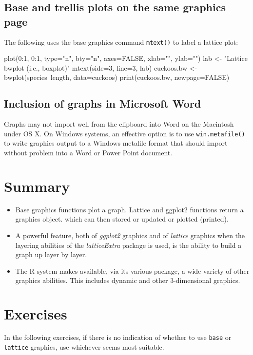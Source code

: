 \documentclass{tufte-book}\usepackage[]{graphicx}\usepackage[]{color}
\newcommand{\txtt}[1]{\texttt{#1}}
\begin{document}
\subsection*{Base and trellis plots on the same graphics page}

The following uses the base graphics command \txtt{mtext()}
to label a lattice plot:
\begin{Schunk}
\begin{Sinput}
plot(0:1, 0:1, type="n", bty="n", axes=FALSE,
     xlab="", ylab="")
lab <- "Lattice bwplot (i.e., boxplot)"
mtext(side=3, line=3, lab)
cuckoos.bw <- bwplot(species~length, data=cuckoos)
print(cuckoos.bw, newpage=FALSE)
\end{Sinput}
\end{Schunk}

\subsection*{Inclusion of graphs in Microsoft Word}

Graphs may not import well from the clipboard into Word on the
Macintosh under OS X.  On Windows systems, an effective option is to
use \txtt{win.metafile()} to write graphics output to a Windows
metafile format that should import without problem into a Word or
Power Point document.

\section{Summary}
\begin{itemize}
\item[] Base graphics functions plot a graph.  Lattice and ggplot2
functions return a graphics object. which can then stored or updated
or plotted (printed).

\item[] A powerful feature, both of \textit{ggplot2} graphics and of
  \textit{lattice} graphics when the layering abilities of the
  \textit{latticeExtra} package is used, is the ability to build a
  graph up layer by layer.

\item[] The R system makes available, via its various package,
a wide variety of other graphics abilities.  This includes
dynamic and other 3-dimensional graphics.
\end{itemize}


\section{Exercises}\label{sec:plot}
In the following exercises, if there is no indication of whether to
use \txtt{base} or \txtt{lattice} graphics, use whichever seems
most suitable.
\end{document}

